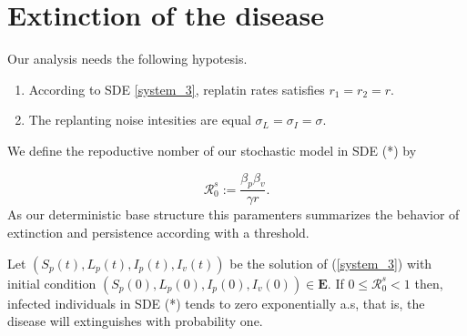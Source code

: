 
\section{Extinction of the disease}


Our analysis needs the following hypotesis.
\begin{enumerate}[(H-1)]
	\item
	 	According to SDE \eqref{system_3}, replatin rates satisfies 
	  	$r_1=r_2 = r$. 
	\item
		The replanting noise intesities are equal
	  	$\sigma_L = \sigma_I = \sigma$.
\end{enumerate}
%


We define the repoductive nomber of our stochastic model in SDE (*) by

\begin{equation}
	\label{eq5}
	\mathcal{R}_0^s :=\frac{\beta_p\beta_v}{\gamma r}.
\end{equation}
As our deterministic base structure this paramenters summarizes the behavior of 
extinction and persistence according with a threshold.



\begin{theorem}\label{theorem_2}
	Let $(S_p(t),L_p(t),I_p(t),I_v(t))$ be the solution of 
	(\ref{system_3}) 
	with initial condition $(S_p(0),L_p(0),I_p(0),I_v(0))\in \mathbf{E}$.
	If $0 \leq \mathcal{R}_0 ^ s < 1$  then, infected individuals 
	in SDE (*) tends to zero exponentially a.s, that is,
	the disease will extinguishes with probability one.
\end{theorem}

